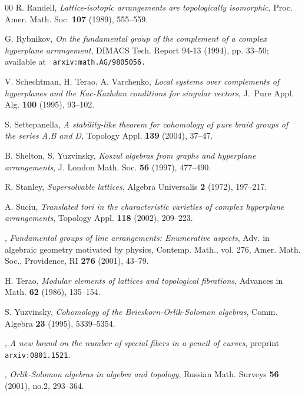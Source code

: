 \documentclass[psamsfonts]{conm-p-l}
\theoremstyle{definition}
\theoremstyle{remark}
\numberwithin{equation}{section}
\begin{document}
\begin{thebibliography}{00}
 R. Randell,
\textit{ Lattice-isotopic arrangements are topologically isomorphic},
Proc. Amer. Math. Soc. \textbf{107} (1989), 555--559.

 G. Rybnikov,
\textit{ On the fundamental group of the
complement of a complex hyperplane arrangement},
DIMACS Tech. Report 94-13 (1994), pp. 33--50; available at
\texttt{%
arxiv:math.AG/9805056.}

 V. Schechtman, H. Terao, A. Varchenko,
\textit{ Local systems over complements of hyperplanes and the
{K}ac-{K}azhdan conditions for singular vectors},
J.~Pure Appl. Alg. \textbf{100} (1995), 93--102. 

 S. Settepanella,
\textit{ A stability-like theorem for cohomology of pure braid groups of 
the series A,B and D}, Topology Appl. \textbf{139} (2004), 37--47.

 B. Shelton, S. Yuzvinsky,
\textit{ Koszul algebras from graphs and hyperplane arrangements},
J. London Math. Soc. \textbf{56} (1997), 477--490.

 R. Stanley,
\textit{ Supersolvable lattices}, Algebra Universalis \textbf{2} (1972),
197--217.

 A. Suciu,
\textit{ Translated tori in the characteristic varieties of complex hyperplane arrangements},
Topology  Appl. \textbf{118} (2002), 209--223.

 \bysame,
\textit{ Fundamental groups of line arrangements: Enumerative aspects},
Adv. in algebraic geometry motivated by physics, Contemp. Math., vol. 276, Amer. Math. Soc., Providence, RI \textbf{276} (2001), 43--79.

 H. Terao,
\textit{ Modular elements of lattices and topological fibrations},
Advances in Math. \textbf{62} (1986), 135--154.

 S. Yuzvinsky,
\textit{ Cohomology of the Brieskorn-Orlik-Solomon algebras},
Comm. Algebra \textbf{23} (1995), 5339--5354.

 \bysame,
\textit{ A new bound on the number of special fibers in a pencil of curves},
preprint {\tt arxiv:0801.1521}.

 \bysame,
\textit{ Orlik-Solomon algebras in algebra and topology}, Russian Math. Surveys \textbf{56} (2001), no.2, 293--364.

\end{thebibliography}
\end{document}
